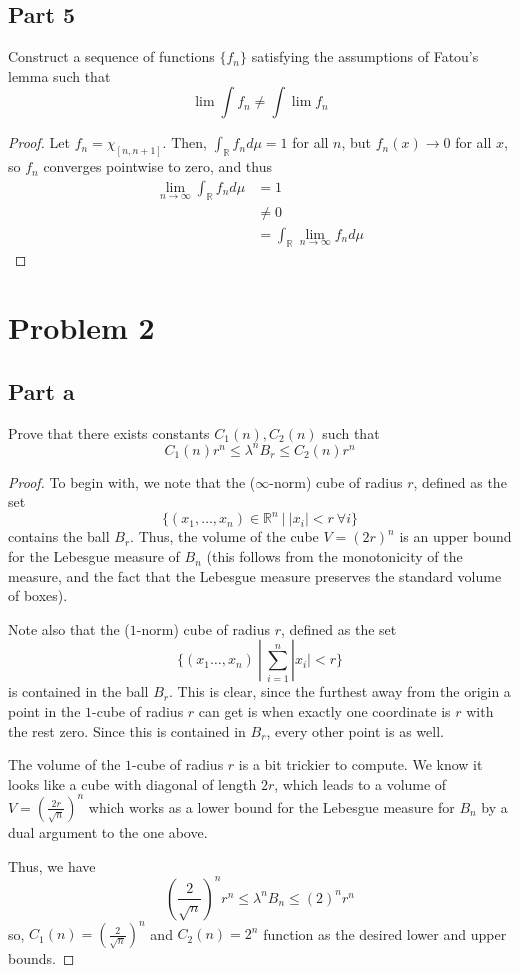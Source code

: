 \documentclass[fontsize=11pt]{scrartcl} %
\numberwithin{equation}{section} %
\numberwithin{figure}{section} %
\numberwithin{table}{section} %
\newcommand{\R}{\mathbb{R}}
\begin{document}
\subsection*{Part 5}
Construct a sequence of functions $\{f_n\}$ satisfying the assumptions of Fatou's lemma such that
\[
\lim\int f_n \neq \int\lim f_n
\]

\begin{proof}
Let $f_n = \chi_{[n,n+1]}$. Then, $\int_{\R}f_nd\mu = 1$ for all $n$, but $f_n(x)\to 0$ for
all $x$, so $f_n$ converges pointwise to zero, and thus
\[
\begin{aligned}
\lim_{n\to\infty}\int_{\R}f_nd\mu   &= 1\\
                                    &\neq 0\\
                                    &=\int_{\R}\lim_{n\to\infty}f_nd\mu
\end{aligned}
\]
\end{proof}
\section*{Problem 2}
\subsection*{Part a}
Prove that there exists constants $C_1(n), C_2(n)$ such that
\[
C_1(n)r^n \leq \lambda^n B_r \leq C_2(n)r^n
\]

\begin{proof}
To begin with, we note that the ($\infty$-norm) cube of radius $r$, defined as the set
\[
\{(x_1,\ldots,x_n)\in\R^n\ |\ |x_i| < r\ \forall i\}
\]
contains the ball $B_r$. Thus, the volume of the cube $V = (2r)^n$ is an upper
bound for the Lebesgue measure of $B_n$ (this follows from the monotonicity of the measure,
and the fact that the Lebesgue measure preserves the standard volume of boxes).

Note also that the ($1$-norm) cube of radius $r$, defined as the set
\[
\{(x_1\ldots,x_n)\ |\ \sum_{i=1}^n |x_i| < r\}
\]
is contained in the ball $B_r$. This is clear, since the furthest away from the origin
a point in the $1$-cube of radius $r$ can get is when exactly one coordinate is $r$
with the rest zero. Since this is contained in $B_r$, every other point is as well.

The volume of the $1$-cube of radius $r$ is a bit trickier to compute. We know
it looks like a cube with diagonal of length $2r$, which leads to a volume of
$V = (\frac{2r}{\sqrt{n}})^n$ which works as a lower bound for the Lebesgue measure
for $B_n$ by a dual argument to the one above.

Thus, we have
\[
\left(\frac{2}{\sqrt{n}}\right)^nr^n \leq \lambda^n B_n \leq (2)^nr^n
\]
so, $C_1(n) = \left(\frac{2}{\sqrt{n}}\right)^n$ and $C_2(n) = 2^n$ function
as the desired lower and upper bounds.
\end{proof}
\end{document}
